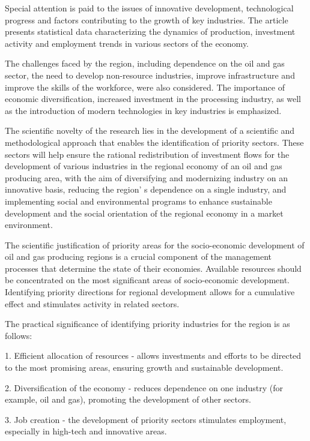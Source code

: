 Special attention is paid to the issues of innovative development,
technological progress and factors contributing to the growth of key
industries. The article presents statistical data characterizing the
dynamics of production, investment activity and employment trends in
various sectors of the economy.

The challenges faced by the region, including dependence on the oil and
gas sector, the need to develop non-resource industries, improve
infrastructure and improve the skills of the workforce, were also
consid\-ered. The importance of economic diversification, increased
investment in the processing industry, as well as the introduction of
modern technologies in key industries is emphasized.

The scientific novelty of the research lies in the development of a
scientific and methodological approach that enables the identification
of priority sectors. These sectors will help ensure the rational
redistribution of investment flows for the development of various
industries in the regional economy of an oil and gas producing area,
with the aim of diversifying and modernizing industry on an innovative
basis, reducing the region' s dependence on a single
industry, and implementing social and environmental programs to enhance
sustainable development and the social orientation of the regional
economy in a market environment.

The scientific justification of priority areas for the socio-economic
development of oil and gas producing regions is a crucial component of
the management processes that determine the state of their economies.
Available resources should be concentrated on the most significant areas
of socio-economic development. Identifying priority directions for
regional development allows for a cumulative effect and stimulates
activity in related sectors.

The practical significance of identifying priority industries for the
region is as follows:

1. Efficient allocation of resources - allows investments and efforts to
be directed to the most promising areas, ensuring growth and sustainable
development.

2. Diversification of the economy - reduces dependence on one industry
(for example, oil and gas), promoting the development of other sectors.

3. Job creation - the development of priority sectors stimulates
employment, especially in high-tech and innovative areas.

